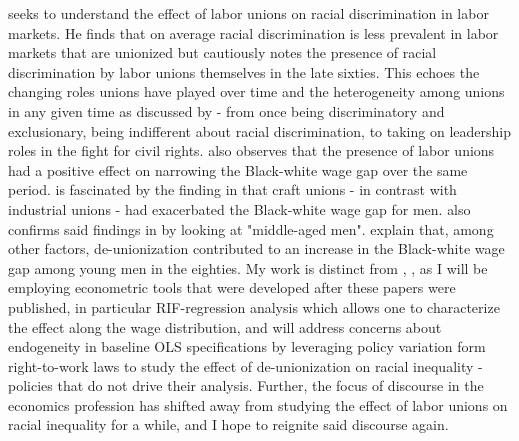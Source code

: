 \documentclass[11pt]{article}
\begin{document}
\citet{ashenfelter1972} seeks to understand the effect of labor unions on racial discrimination in labor markets. He finds that on average racial discrimination is less prevalent in labor markets that are unionized but cautiously notes the presence of racial discrimination by labor unions themselves in the late sixties. This echoes the changing roles unions have played over time and the heterogeneity among unions in any given time as discussed by \citet{frymer2007} - from once being discriminatory and exclusionary, being indifferent about racial discrimination, to taking on leadership roles in the fight for civil rights. \citet{ashenfelter1972} also observes that the presence of labor unions had a positive effect on narrowing the Black-white wage gap over the same period. \citet{leigh1978} is fascinated by the finding in \citet{ashenfelter1972} that craft unions - in contrast with industrial unions - had exacerbated the Black-white wage gap for men. \citet{leigh1978} also confirms said findings in \citet{ashenfelter1972} by looking at "middle-aged men". \citet{boundfreeman1992} explain that, among other factors, de-unionization contributed to an increase in the Black-white wage gap among young men in the eighties. My work is distinct from \citet{ashenfelter1972}, \citet{leigh1978}, \citet{boundfreeman1992} as I will be employing econometric tools that were developed after these papers were published, in particular RIF-regression analysis which allows one to characterize the effect along the wage distribution, and will address concerns about endogeneity in baseline OLS specifications by leveraging policy variation form right-to-work laws to study the effect of de-unionization on racial inequality - policies that do not drive their analysis. Further, the focus of discourse in the economics profession has shifted away from studying the effect of labor unions on racial inequality for a while, and I hope to reignite said discourse again.
\end{document}
